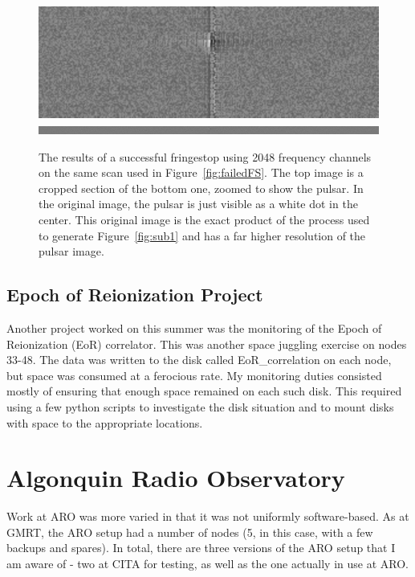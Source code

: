 \documentclass[a4paper,12pt]{article}
\begin{document}
\begin{figure}
\centering
\includegraphics[width=\linewidth]{4096ChanLag.pdf}
\includegraphics[width=\linewidth]{lag102.pdf}
\caption{The results of a successful fringestop using 2048 frequency channels on the same scan used in Figure~\ref{fig:failedFS}. The top image is a cropped section of the bottom one, zoomed to show the pulsar. In the original image, the pulsar is just visible as a white dot in the center. This original image is the exact product of the process used to generate Figure~\ref{fig:sub1} and has a far higher resolution of the pulsar image.}
\label{fig:successfulFS}
\end{figure}

\subsection{Epoch of Reionization Project}
\label{sec:eor}

Another project worked on this summer was the monitoring of the Epoch of Reionization (EoR) correlator. This was another space juggling exercise on nodes 33-48. The data was written to the disk called EoR\_correlation on each node, but space was consumed at a ferocious rate. My monitoring duties consisted mostly of ensuring that enough space remained on each such disk. This required using a few python scripts to investigate the disk situation and to mount disks with space to the appropriate locations.

\section{Algonquin Radio Observatory}
\label{sec:aro}

Work at ARO was more varied in that it was not uniformly software-based. As at GMRT, the ARO setup had a number of nodes (5, in this case, with a few backups and spares). In total, there are three versions of the ARO setup that I am aware of  - two at CITA for testing, as well as the one actually in use at ARO.
\end{document}
